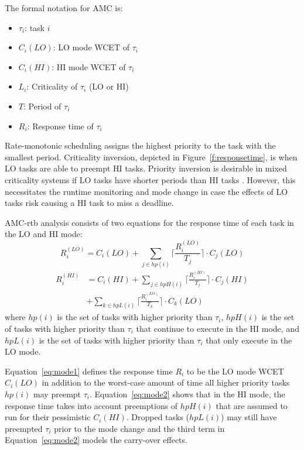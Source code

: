 	The formal notation for AMC is:
	\begin{itemize}
	  \item $\tau_i$: task $i$
	  \item $C_i(LO)$: LO mode WCET of $\tau_i$
	  \item $C_i(HI)$: HI mode WCET of $\tau_i$
	  \item $L_i$: Criticality of $\tau_i$ (LO or HI)
	  \item $T$: Period of $\tau_i$
	  \item $R_i$: Response time of $\tau_i$
	\end{itemize}

	Rate-monotonic scheduling assigns the highest priority to the task with the smallest period. Criticality inversion, depicted in Figure~\ref{f:responsetime}, is when LO tasks are able to preempt HI tasks. Priority inversion is desirable in mixed criticality systems if LO tasks have shorter periods than HI tasks \cite{baruah2011response}. However, this necessitates the runtime monitoring and mode change in case the effects of LO tasks risk causing a HI task to miss a deadline.


AMC-rtb analysis consists of two equations for the response time of each task in the LO and HI mode:
\begin{equation}
R_i^{(LO)}= C_i(LO)+\sum_{j \in hp(i)}\Big\lceil\frac{R_i^{(LO)}}{T_j}\Big\rceil \cdot C_j(LO)
\label{eq:mode1}
\end{equation}
\begin{equation}
\begin{aligned}
R_i^{(HI)} &  = C_i(HI)+\sum_{j \in hpH(i)}\Big\lceil\frac{R_i^{(HI)}}{T_j}\Big\rceil \cdot C_j(HI) \\
&  +\sum_{k \in hpL(i)}\Big\lceil\frac{R_i^{(LO)}}{T_k}\Big\rceil \cdot C_k(LO)
\end{aligned}
\label{eq:mode2}
\end{equation}
where $hp(i)$ is the set of tasks with higher priority than $\tau_i$, $hpH(i)$ is the set of tasks with higher priority than $\tau_i$ that continue to execute in the HI mode, and $hpL(i)$ is the set of tasks with higher priority than $\tau_i$ that only execute in the LO mode.

	Equation~\ref{eq:mode1} defines the response time $R_i$ to be the LO mode WCET $C_i(LO)$ in addition to the worst-case amount of time all higher priority tasks $hp(i)$ may preempt $\tau_i$. 
	Equation~\ref{eq:mode2} shows that in the HI mode, the response time takes into account preemptions of $hpH(i)$ that are assumed to run for their pessimistic $C_i(HI)$. 
	Dropped tasks ($hpL(i)$) may still have preempted $\tau_i$ prior to the mode change and the third term in Equation~\ref{eq:mode2} models the carry-over effects.

